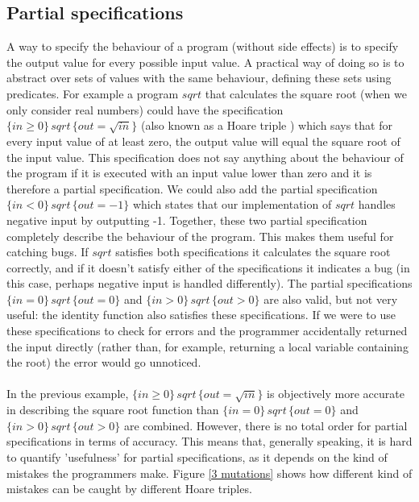 \documentclass[a4paper, fleqn]{article}
\begin{document}
\subsection{Partial specifications}
A way to specify the behaviour of a program (without side effects) is to specify
the output value for every possible input value. A practical way of doing
so is to abstract over sets of values with the same behaviour, defining these
sets using predicates. For example a program $sqrt$ that calculates the square
root (when we only consider real numbers) could have the specification $ \{in \geq 0\}\,sqrt\, \{out = \sqrt{in}\}$ (also known as
a Hoare triple \cite{hoare}) which says that for every input value of at least zero, the
output value will equal the square root of the input value. This specification
does not say anything about the behaviour of the program if it is executed
with an input value lower than zero and it is therefore a partial specification.
We could also add the partial specification $ \{in < 0\}\,sqrt\, \{out = -1\}$
which states that our implementation of $sqrt$ handles negative input by outputting
-1. Together, these two partial specification completely describe the
behaviour of the program. This makes them useful for catching bugs. If $sqrt$
satisfies both specifications it calculates the square root correctly, and if it
doesn’t satisfy either of the specifications it indicates a bug (in this case,
perhaps negative input is handled differently). The partial specifications
$ \{in = 0\}\,sqrt\, \{out = 0\}$ and $ \{in > 0\}\,sqrt\, \{out > 0\}$ are also valid, but not
very useful: the identity function also satisfies these specifications. If we were to use these specifications to check for errors and the programmer accidentally returned the input directly (rather than, for example, returning a local variable containing the root) the error would go unnoticed. 
\\
\\
In the previous example, $\{in \geq 0\}\,sqrt\, \{out = \sqrt{in}\}$ is objectively more accurate in describing the square root function than $ \{in = 0\}\,sqrt\, \{out = 0\}$ and $ \{in > 0\}\,sqrt\, \{out > 0\}$ are combined. However, there is no total order for partial specifications in terms of accuracy. This means that, generally speaking, it is hard to quantify 'usefulness' for partial specifications, as it depends on the kind of mistakes the programmers make. Figure \ref{3 mutations} shows how different kind of mistakes can be caught by different Hoare triples.
\end{document}
